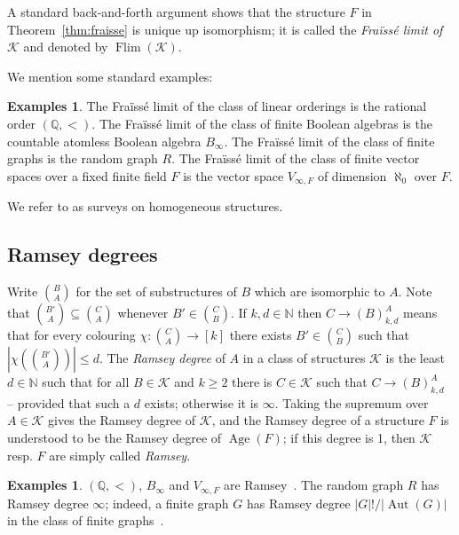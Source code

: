 \documentclass[12pt]{amsart}
\theoremstyle{plain}
\theoremstyle{definition}
\newtheorem{examples}[theorem]{Examples}
\begin{document}
A standard back-and-forth argument shows that the structure $F$ in Theorem~\ref{thm:fraisse} is unique up isomorphism; 
it is called the {\em Fra\"iss\'e limit of ${\mathcal K}$} and denoted by $\operatorname{Flim}({\mathcal K})$. 

We mention some standard examples:

\begin{examples}\label{exas:fraisseclasses} The Fra\"iss\'e limit of the class of linear orderings is the rational order $(\mathbb Q,<)$. 
The Fra\"iss\'e limit of the class of finite Boolean algebras is the countable atomless Boolean algebra $B_\infty$. 
The Fra\"iss\'e limit of the class of finite graphs is the random graph $R$. The Fra\"iss\'e limit of 
the class of finite vector spaces over a fixed finite field $F$ is the vector space $V_{\infty,F}$ of 
dimension $\aleph_0$ over $F$.
\end{examples}

We refer to \cite{cameron,cherlin,mcph} as surveys on homogeneous structures.

\subsection{Ramsey degrees} Write ${B \choose A}$ for the set of substructures of $B$ which are isomorphic to $A$. 
Note that ${B'\choose A}\subseteq{C\choose A}$ whenever $B'\in{C\choose B}$.
If $k,d\in{\mathbb N}$ then $C\to (B)^A_{k,d}$ means that for every colouring $\chi:{C\choose A}\to [k]$ 
there exists $B'\in{C\choose B}$ such that $|\chi({B'\choose A})|\le d$. The {\em Ramsey degree} of $A$ in
 a class 
of structures ${\mathcal K}$ is the least $d\in{\mathbb N}$ such that for all $B\in {\mathcal K}$ and $k\ge 2$ there is $C\in{\mathcal K}$ 
such that $C\to (B)^A_{k,d}$ -- provided that such a $d$ exists; otherwise it is $\infty$. 
Taking the supremum over $A\in{\mathcal K}$ gives the Ramsey degree of ${\mathcal K}$, and 
the Ramsey degree of a structure $F$ is understood to be the Ramsey degree of $\operatorname{Age}(F)$; if 
this degree is 1, then ${\mathcal K}$ resp. $F$ are simply called {\em Ramsey}. 

\begin{examples} $(\mathbb Q,<)$, $B_\infty$ and $V_{\infty,F}$ are Ramsey~\cite{kpt}. 
The random graph $R$ has Ramsey degree $\infty$; indeed, a finite graph $G$ has Ramsey 
degree $|G|!/|\operatorname{Aut}(G)|$ in the class of finite graphs~\cite[$\S10$]{kpt}.
\end{examples}
\end{document}
